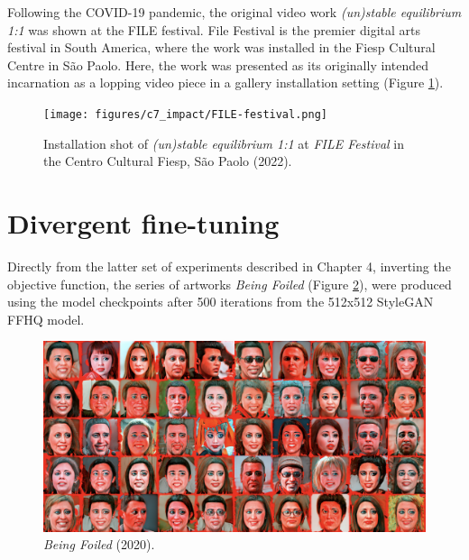 Following the COVID-19 pandemic, the original video work \textit{(un)stable equilibrium 1:1} was shown at the FILE festival. 
File Festival is the premier digital arts festival in South America, where the work was installed in the Fiesp Cultural Centre in São Paolo. 
Here, the work was presented as its originally intended incarnation as a lopping video piece in a gallery installation setting (Figure \ref{fig:c7:file-festival}).

\begin{figure}[!htb]
    \centering
    \captionsetup{justification=centering}
    \texttt{[image: figures/c7\_impact/FILE-festival.png]}
    \caption[Installation shot of \textit{(un)stable equilibrium} at FILE festival]{Installation shot of \textit{(un)stable equilibrium 1:1} at \textit{FILE Festival} in the Centro Cultural Fiesp, São Paolo (2022).}
    \label{fig:c7:file-festival}
\end{figure}

\section{Divergent fine-tuning}
\label{c7:sec:divergent}


Directly from the latter set of experiments described in Chapter 4, inverting the objective function, the series of artworks \textit{Being Foiled} (Figure \ref{fig:c7:being-foiled}), were produced using the model checkpoints after 500 iterations from the 512x512 StyleGAN FFHQ model. 

\begin{figure}[!htb]
    \centering
    \captionsetup{justification=centering}
    \includegraphics[width=1\textwidth]{figures/c7_impact/being-foiled.png}
    \caption{\textit{Being Foiled} (2020).}
    \label{fig:c7:being-foiled}
\end{figure}

